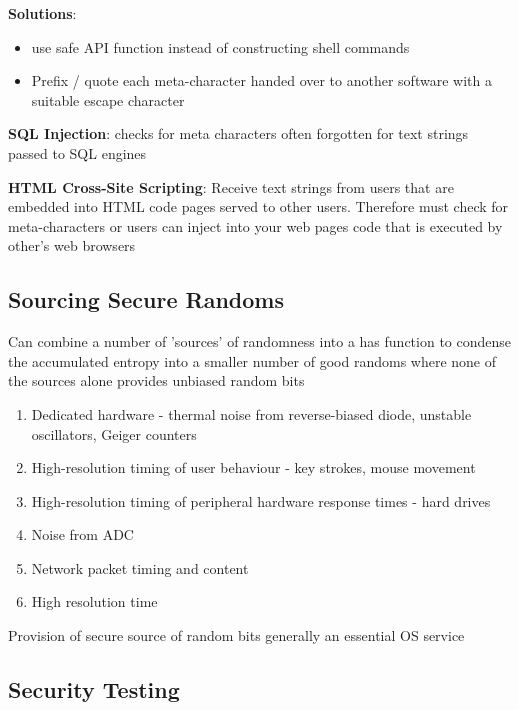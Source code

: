 \documentclass{article}
\newenvironment{pros}{\par\color[rgb]{0.066, 0.4, 0.129}}{\par}
\begin{document}
\begin{pros}
\bigskip
\noindent
\textbf{Solutions}:
\begin{itemize}
	\item use safe API function instead of constructing shell commands
	\item Prefix / quote each meta-character handed over to another software with a suitable escape character
\end{itemize}
\end{pros}

\noindent
\textbf{SQL Injection}: checks for meta characters often forgotten for text strings passed to SQL engines

\noindent
\bigskip
\textbf{HTML Cross-Site Scripting}: Receive text strings from users that are embedded into HTML code pages served to other users. Therefore must check for meta-characters or users can inject into your web pages code that is executed by other's web browsers

\subsection{Sourcing Secure Randoms}
Can combine a number of 'sources' of randomness into a has function to condense the accumulated entropy into a smaller number of good randoms where none of the sources alone provides unbiased random bits
\begin{enumerate}
	\item Dedicated hardware - thermal noise from reverse-biased diode, unstable oscillators, Geiger counters
	\item High-resolution timing of user behaviour - key strokes, mouse movement
	\item High-resolution timing of peripheral hardware response times - hard drives
	\item Noise from ADC
	\item Network packet timing and content
	\item High resolution time
\end{enumerate}

Provision of secure source of random bits generally an essential OS service

\subsection{Security Testing}
\end{document}
